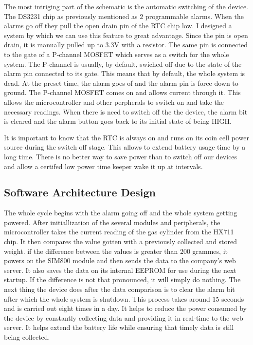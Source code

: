 The most intriging part of the schematic is the automatic switching of the device. The DS3231 chip as previously mentioned as 2 programmable alarms. When the alarms go off they pull the open drain pin of the RTC chip low. I designed a system by which we can use this feature to great advantage. Since the pin is open drain, it is manually pulled up to 3.3V with a resistor. The same pin is connected to the gate of a P-channel MOSFET which serves as a switch for the whole system. The P-channel is usually, by default, swiched off due to the state of the alarm pin connected to its gate. This means that by default, the whole system is dead. At the preset time, the alarm goes of and the alarm pin is force down to ground. The P-channel MOSFET comes on and allows current through it. This allows the microcontroller and other perpherals to switch on and take the necessary readings. When there is need to switch off the the device, the alarm bit is cleared and the alarm button goes back to its initial state of being HIGH.

It is important to know that the RTC is always on and runs on its coin cell power source during the switch off stage. This allows to extend battery usage time by a long time. There is no better way to save power than to switch off our devices and allow a certifed low power time keeper wake it up at intervals. 

\subsection{Software Architecture Design}
The whole cycle begins with the alarm going off and the whole system getting powered. After initiallization of the several modules and peripherals, the microcontroller takes the current reading of the gas cylinder from the HX711 chip. It then compares the value gotten with a previously collected and stored weight. if the difference between the values is greater than 200 grammes, it powers on the SIM800 module and then sends the data to the company's web server. It also saves the data on its internal EEPROM for use during the next startup. If the difference is not that pronounced, it will simply do nothing. The next thing the device does after the data comparison is to clear the alarm bit after which the whole system is shutdown. This process takes around 15 seconds and is carried out eight times in a day. It helps to reduce the power consumed by the device by constantly collecting data and providing it in real-time to the web server. It helps extend the battery life while ensuring that timely data is still being collected.

